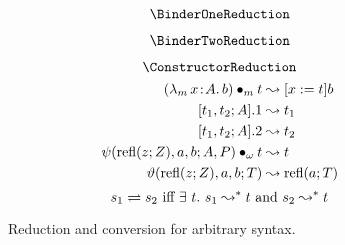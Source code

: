 
\begin{figure}
    \centering
    \begin{minipage}{0.5\textwidth}
        $$\BinderOneReduction$$
    \end{minipage}%
    \begin{minipage}{0.5\textwidth}
        $$\BinderTwoReduction$$
    \end{minipage}
    $$\ConstructorReduction$$
    \begin{align*}
        ({\lambda_m}\, x\! : \! A.\, b) \bullet_{m} t &\leadsto [x := t]b \\
        [t_1, t_2; A].1 &\leadsto t_1 \\
        [t_1, t_2; A].2 &\leadsto t_2 \\
        \psi(\text{refl}(z; Z), a, b; A, P) \bullet_{\omega} t &\leadsto t \\
        \vartheta(\text{refl}(z; Z), a, b; T) &\leadsto \text{refl}(a; T)
    \end{align*}
    $$s_1 \rightleftharpoons s_2 \text{ iff } \exists\ t.\ s_1 \leadsto^* t \text{ and } s_2 \leadsto^* t$$
    \caption{Reduction and conversion for arbitrary syntax.}
    \label{fig:reduction}
\end{figure}



